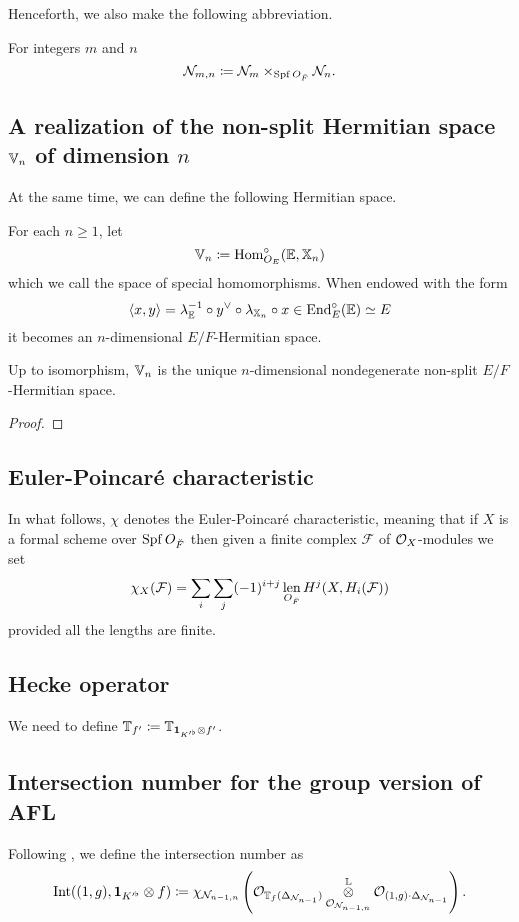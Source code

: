Henceforth, we also make the following abbreviation.
\begin{definition}
  For integers $m$ and $n$
  \[ \mathcal N_{m,n} \coloneq \mathcal N_{m} \times_{\operatorname{Spf} O_{\breve F}} \mathcal N_n. \]
\end{definition}

\subsection{A realization of the non-split Hermitian space $\mathbb V_n$ of dimension $n$}
At the same time, we can define the following Hermitian space.
\begin{definition}
  For each $n \ge 1$, let
  \[ \mathbb V_n \coloneqq \operatorname{Hom}_{O_E}^\circ (\mathbb E, \mathbb X_n) \]
  which we call the space of special homomorphisms.
  When endowed with the form
  \[ \left< x,y \right> = \lambda_{\mathbb E}^{-1} \circ y^\vee \circ \lambda_{\mathbb X_n} \circ x
    \in \operatorname{End}_{E}^\circ(\mathbb E) \simeq E \]
  it becomes an $n$-dimensional $E/F$-Hermitian space.
\end{definition}
\begin{proposition}
  Up to isomorphism, $\mathbb V_n$ is the unique $n$-dimensional
  nondegenerate non-split $E/F$-Hermitian space.
\end{proposition}
\begin{proof}
\end{proof}

\subsection{Euler-Poincar\'{e} characteristic}
In what follows, $\chi$ denotes the Euler-Poincar\'{e} characteristic,
meaning that if $X$ is a formal scheme over $\operatorname{Spf} O_{\breve F}$
then given a finite complex $\mathcal{F}$ of $\mathcal{O}_X$-modules we set
\[ \chi_X(\mathcal{F}) = \sum_i \sum_j (-1)^{i+j}
  \operatorname*{len}_{O_{\breve F}} H^j(X, H_i(\mathcal F)) \]
provided all the lengths are finite.

\subsection{Hecke operator}
We need to define $\mathbb T_{f'} \coloneqq \mathbb T_{\mathbf{1}_{K'^\flat} \otimes f'}$.

\subsection{Intersection number for the group version of AFL}
\begin{definition}
  Following \cite[\S6]{ref:AFLspherical}, we define the intersection number as
  \[
    \operatorname{Int}((1,g), \mathbf{1}_{K'^\flat} \otimes f)
    \coloneqq \chi_{\mathcal N_{n-1,n}} \left( \mathcal{O}_{\mathbb T_f (\Delta_{\mathcal N_{n-1}})}
      \mathop{\otimes}^{\mathbb L}_{\mathcal{O}_{\mathcal N_{n-1,n}}} \mathcal{O}_{(1,g) \cdot \Delta_{\mathcal N_{n-1}}} \right).
  \]
\end{definition}

